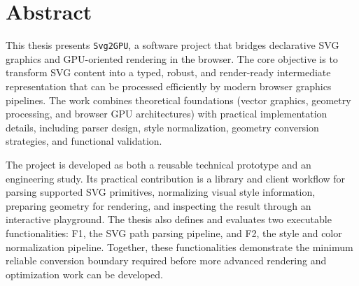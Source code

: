 \chapter*{Abstract}
{}

This thesis presents \texttt{Svg2GPU}, a software project that bridges declarative SVG graphics and GPU-oriented rendering in the browser.
The core objective is to transform SVG content into a typed, robust, and render-ready intermediate representation that can be processed efficiently by modern browser graphics pipelines.
The work combines theoretical foundations (vector graphics, geometry processing, and browser GPU architectures) with practical implementation details, including parser design, style normalization, geometry conversion strategies, and functional validation.

The project is developed as both a reusable technical prototype and an engineering study.
Its practical contribution is a library and client workflow for parsing supported SVG primitives, normalizing visual style information, preparing geometry for rendering, and inspecting the result through an interactive playground.
The thesis also defines and evaluates two executable functionalities: F1, the SVG path parsing pipeline, and F2, the style and color normalization pipeline.
Together, these functionalities demonstrate the minimum reliable conversion boundary required before more advanced rendering and optimization work can be developed.
